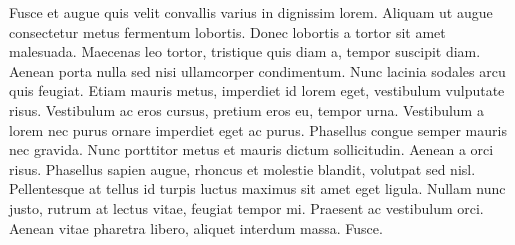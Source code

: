 Fusce et augue quis velit convallis varius in dignissim lorem. 
Aliquam ut augue consectetur metus fermentum lobortis. Donec lobortis 
a tortor sit amet malesuada. Maecenas leo tortor, tristique quis 
diam a, tempor suscipit diam. Aenean porta nulla sed nisi ullamcorper 
condimentum. Nunc lacinia sodales arcu quis feugiat. Etiam mauris 
metus, imperdiet id lorem eget, vestibulum vulputate risus. Vestibulum 
ac eros cursus, pretium eros eu, tempor urna. Vestibulum a lorem 
nec purus ornare imperdiet eget ac purus. Phasellus congue semper 
mauris nec gravida. Nunc porttitor metus et mauris dictum sollicitudin.
Aenean a orci risus. Phasellus sapien augue, rhoncus et molestie blandit, 
volutpat sed nisl. Pellentesque at tellus id turpis luctus maximus 
sit amet eget ligula. Nullam nunc justo, rutrum at lectus vitae, 
feugiat tempor mi. Praesent ac vestibulum orci. Aenean vitae pharetra 
libero, aliquet interdum massa. Fusce.

\newpage
\thispagestyle{empty}
\mbox{}

\newpage